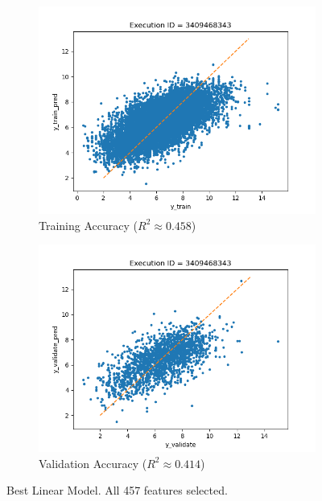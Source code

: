\documentclass[11pt]{article}
\begin{document}
\begin{figure}
     \centering
     \begin{subfigure}[b]{0.45\textwidth}
         \centering
         \includegraphics[scale=0.45]{images/accuracy_train_all_linear}
         \caption{Training Accuracy ($R^2 \approx 0.458$)}
        \label{fig:TrainingAccuracyLinearModel}
     \end{subfigure}
     \hfill
     \begin{subfigure}[b]{0.45\textwidth}
         \centering
         \includegraphics[scale=0.45]{images/accuracy_validate_all_linear}
        \caption{Validation Accuracy ($R^2 \approx 0.414$)}
        \label{fig:ValidationAccuracyLinearModel}
     \end{subfigure}
     \caption{Best Linear Model.  All 457 features selected.}
     \label{fig:BestLinearModel}
\end{figure}
\end{document}
